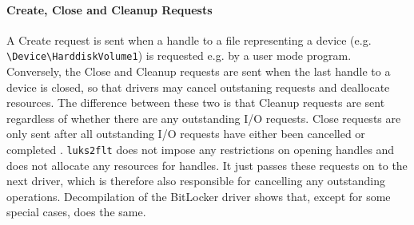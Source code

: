 
\paragraph{Create, Close and Cleanup Requests} A Create request is sent when a handle to a file representing a device (e.g. \texttt{\textbackslash Device\textbackslash HarddiskVolume1}) is requested e.g. by a user mode program. Conversely, the Close and Cleanup requests are sent when the last handle to a device is closed, so that drivers may cancel outstaning requests and deallocate resources. The difference between these two is that Cleanup requests are sent regardless of whether there are any outstanding I/O requests. Close requests are only sent after all outstanding I/O requests have either been cancelled or completed \cite{Kerneldriver}. \texttt{luks2flt} does not impose any restrictions on opening handles and does not allocate any resources for handles. It just passes these requests on to the next driver, which is therefore also responsible for cancelling any outstanding operations. Decompilation of the BitLocker driver shows that, except for some special cases, does the same.


